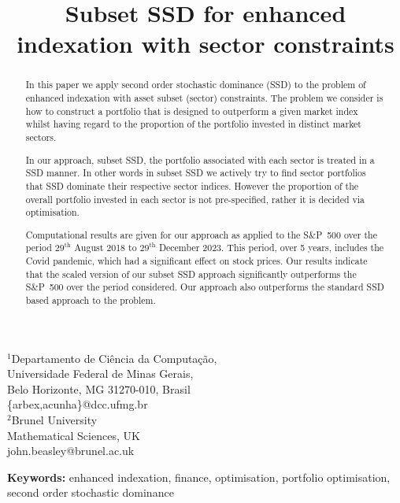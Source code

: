 
\title{Subset SSD for enhanced indexation with sector constraints}
\maketitle

\begin{center} 
{\footnotesize

$^1$Departamento de Ci\^{e}ncia da Computa\c{c}\~{a}o, \\
 Universidade Federal de Minas Gerais, \\
 Belo Horizonte, MG 31270-010, Brasil \\
\{arbex,acunha\}@dcc.ufmg.br \\ \vspace{0.3cm}
$^2$Brunel University \\ Mathematical Sciences, UK \\ john.beasley@brunel.ac.uk \\
}
\end{center} 


\begin{abstract}

In this paper we apply second order stochastic dominance (SSD) to the problem of enhanced indexation with asset subset (sector) constraints. The problem we
 consider is how to construct a portfolio that is
designed to outperform a given market index whilst having regard to the proportion of the portfolio invested in distinct market sectors. 

In our approach, subset SSD,  the portfolio associated with each sector is treated in a SSD manner. 
In other words in subset SSD we actively try to find sector portfolios that SSD dominate their respective sector indices.
However the proportion of the overall portfolio 
invested in each sector is not pre-specified, rather it is decided via optimisation.

Computational results are given for our approach as applied to the S\&P~500 over the period 
$29^{\text{th}}$ August 2018 to $29^{\text{th}}$ December 2023. This period, over 5 years, includes the Covid pandemic, 
which had a significant effect on stock prices.
Our results indicate that the scaled version of our subset SSD
approach significantly outperforms the S\&P~500 over the period considered. Our approach also outperforms the standard SSD based
approach to the problem.
\end{abstract}

{\bf Keywords:} enhanced indexation, finance, optimisation, portfolio optimisation, second order stochastic dominance

